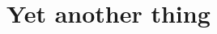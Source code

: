 \documentclass[Bachelorarbeit.tex]{subfiles}
\begin{document}
\chapter{Yet another thing}
\end{document}
